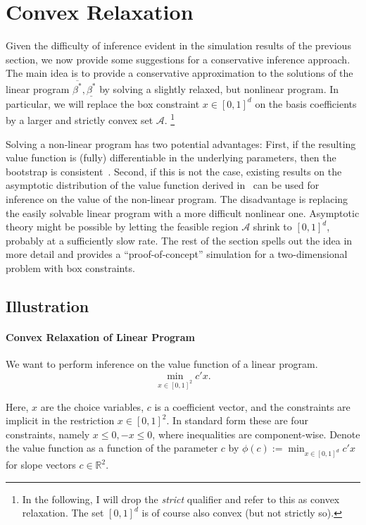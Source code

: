 \documentclass[12pt,a4paper,english]{article} %
\numberwithin{equation}{section}
\theoremstyle{definition}
\theoremstyle{remark}
\theoremstyle{plain}
\begin{document}
\section{Convex Relaxation}\label{sec:convex_relaxation}
Given the difficulty of inference evident in the simulation results of the previous section, we now provide some suggestions for a conservative inference approach.
The main idea is to provide a conservative approximation to the solutions of the linear program $\overline{\beta^*}, \underline{\beta^*}$ by solving a slightly relaxed, but nonlinear program.
In particular, we will replace the box constraint $x\in[0,1]^d$ on the basis coefficients by a larger and strictly convex set $\mathcal{A}$.
\footnote{In the following, I will drop the \textit{strict} qualifier and refer to this as convex relaxation. The set $[0,1]^d$ is of course also convex (but not strictly so).}

Solving a non-linear program has two potential advantages:
First, if the resulting value function is (fully) differentiable in the underlying parameters, then the bootstrap is consistent~\citep{fang2019infdirdiff}.
Second, if this is not the case, existing results on the asymptotic distribution of the value function derived in~\cite{shapiro1991asymptotic} can be used for inference on the value of the non-linear program.
The disadvantage is replacing the easily solvable linear program with a more difficult nonlinear one.
Asymptotic theory might be possible by letting the feasible region $\mathcal{A}$ shrink to $[0,1]^d$, probably at a sufficiently slow rate.
The rest of the section spells out the idea in more detail and provides a ``proof-of-concept'' simulation for a two-dimensional problem with box constraints.

\subsection{Illustration}

\paragraph{Convex Relaxation of Linear Program}
We want to perform inference on the value function of a linear program.
\begin{equation}
	\min_{x\in [0,1]^2} c'x.
\end{equation}

Here, $x$ are the choice variables, $c$ is a coefficient vector, and the constraints are implicit in the restriction $x \in [0,1]^2$.
In standard form these are four constraints, namely $x \leq 0, -x \leq 0$, where inequalities are component-wise.
Denote the value function as a function of the parameter $c$ by $\phi(c) := \min_{x\in[0,1]^d} c'x$ for slope vectors $c\in \mathbb{R}^2$.
\end{document}
